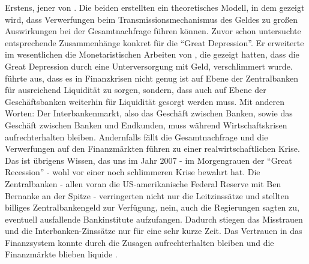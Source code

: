 Erstens, jener von \textcite{Bernanke1988}. Die beiden erstellten ein theoretisches Modell, in dem gezeigt wird, dass Verwerfungen beim Transmissionsmechanismus des Geldes zu großen Auswirkungen bei der Gesamtnachfrage führen können. Zuvor schon untersuchte \textcite{Bernanke1983} entsprechende Zusammenhänge konkret für die "`Great Depression"'. Er erweiterte im wesentlichen die Monetaristischen Arbeiten von \textcite{Friedman1968}, die gezeigt hatten, dass die Great Depression durch eine Unterversorgung mit Geld, verschlimmert wurde. \textcite{Bernanke1983} führte aus, dass es in Finanzkrisen nicht genug ist auf Ebene der Zentralbanken für ausreichend Liquidität zu sorgen, sondern, dass auch auf Ebene der Geschäftsbanken weiterhin für Liquidität gesorgt werden muss. Mit anderen Worten: Der Interbankenmarkt, also das Geschäft zwischen Banken, sowie das Geschäft zwischen Banken und Endkunden, muss während Wirtschaftskrisen aufrechterhalten bleiben. Andernfalls fällt die Gesamtnachfrage und die Verwerfungen auf den Finanzmärkten führen zu einer realwirtschaftlichen Krise. Das ist übrigens Wissen, das uns im Jahr 2007 - im Morgengrauen der "`Great Recession"' - wohl vor einer noch schlimmeren Krise bewahrt hat. Die Zentralbanken - allen voran die US-amerikanische Federal Reserve mit Ben Bernanke an der Spitze - verringerten nicht nur die Leitzinssätze und stellten billiges Zentralbankengeld zur Verfügung, nein, auch die Regierungen sagten zu, eventuell ausfallende Bankinstitute aufzufangen. Dadurch stiegen das Misstrauen und die Interbanken-Zinssätze nur für eine sehr kurze Zeit. Das Vertrauen in das Finanzsystem konnte durch die Zusagen aufrechterhalten bleiben und die Finanzmärkte blieben liquide \parencite[S. 13]{Mankiw1991}.
